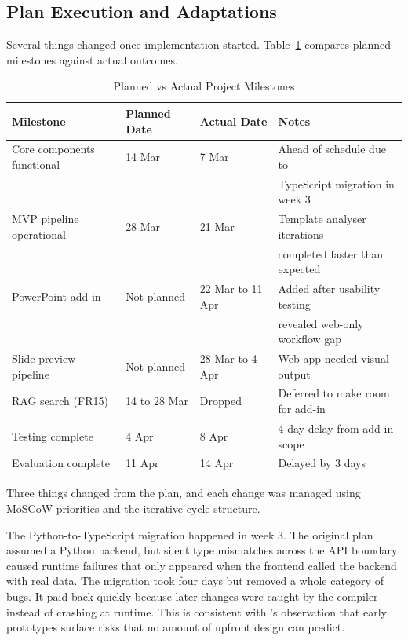 \subsection{Plan Execution and Adaptations}

Several things changed once implementation started. Table~\ref{tab:plan-vs-reality} compares planned milestones against actual outcomes.

\begin{table}[H]
\centering
\begin{tabular}{|l|l|l|l|}
\hline
\rowcolor{gray!20} \textbf{Milestone} & \textbf{Planned Date} & \textbf{Actual Date} & \textbf{Notes} \\
\hline
Core components functional & 14 Mar & 7 Mar & Ahead of schedule due to \\
 & & & TypeScript migration in week 3 \\
\hline
MVP pipeline operational & 28 Mar & 21 Mar & Template analyser iterations \\
 & & & completed faster than expected \\
\hline
PowerPoint add-in & Not planned & 22 Mar to 11 Apr & Added after usability testing \\
 & & & revealed web-only workflow gap \\
\hline
Slide preview pipeline & Not planned & 28 Mar to 4 Apr & Web app needed visual output \\
\hline
RAG search (FR15) & 14 to 28 Mar & Dropped & Deferred to make room for add-in \\
\hline
Testing complete & 4 Apr & 8 Apr & 4-day delay from add-in scope \\
\hline
Evaluation complete & 11 Apr & 14 Apr & Delayed by 3 days \\
\hline
\end{tabular}
\caption{Planned vs Actual Project Milestones}
\label{tab:plan-vs-reality}
\end{table}

Three things changed from the plan, and each change was managed using MoSCoW priorities and the iterative cycle structure.

The Python-to-TypeScript migration happened in week 3. The original plan assumed a Python backend, but silent type mismatches across the API boundary caused runtime failures that only appeared when the frontend called the backend with real data. The migration took four days but removed a whole category of bugs. It paid back quickly because later changes were caught by the compiler instead of crashing at runtime. This is consistent with \textcite{boehm1988}'s observation that early prototypes surface risks that no amount of upfront design can predict.

